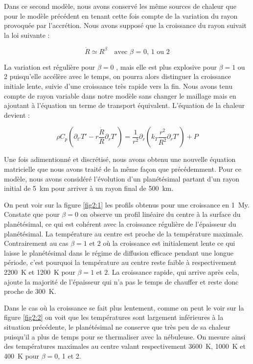 \documentclass[10pt,a4paper]{article}
\numberwithin{equation}{section}
\begin{document}
Dans ce second modèle, nous avons conservé les même sources de chaleur que pour le modèle précédent en tenant cette fois compte de la variation du rayon provoquée par l'accrétion. Nous avons supposé que la croissance du rayon suivait la loi suivante :

\begin{equation}
\dot{R} \simeq R^\beta  \quad \textrm{avec $\beta$ = 0, 1 ou 2}
\end{equation}

La variation est régulière pour $\beta = 0$ , mais elle est plus explosive pour $\beta = 1$ ou $2$ puisqu'elle accélère avec le temps, on pourra alors distinguer la croissance initiale lente, suivie d'une croissance très rapide vers la fin. 
Nous avons tenu compte de rayon variable dans notre modèle sans changer le maillage mais en ajoutant à l'équation un terme de transport équivalent. L'équation de la chaleur devient :

\begin{equation}
\rho C_p (\partial_{t'} T' - r \frac{\dot{R}}{R}\partial_{r} T')= \frac{1}{r^2} \partial_{r} ( k_{T} \frac{r^2}{R^2} \partial_{r} T')  + P
\end{equation}

Une fois adimentionné et discrétisé, nous avons obtenu une nouvelle équation matricielle que nous avons traité de la même façon que précédemment.
Pour ce modèle, nous avons considéré l'évolution d'un planétésimal partant d'un rayon initial de \SI{5}{km} pour arriver à un rayon final de \SI{500}{km}. 

On peut voir sur la figure \ref{fig2:1} les profils obtenus pour une croissance en \SI{1}{My}. Constate que pour $\beta = 0$ on observe un profil linéaire du centre à la surface du planétésimal, ce qui est cohérent avec la croissance régulière de l'épaisseur du planétésimal. La température au centre est proche de la température maximale. Contrairement au cas $\beta = 1$ et $2$ où la croissance est initialement lente ce qui laisse le planétésimal dans le régime de diffusion efficace pendant une longue période, c'est pourquoi la température au centre reste faible à respectivement \SI{2200}{K} et \SI{1200}{K} pour $\beta = 1$ et $2$. La croissance rapide, qui arrive après cela, ajoute la majorité de l'épaisseur qui n'a pas le temps de chauffer et reste donc proche de \SI{300}{K}.

Dans le cas où la croissance se fait plus lentement, comme on peut le voir sur la figure \ref{fig2:2} on voit que les températures sont largement inférieures à la situation précédente, le planétésimal ne conserve que très peu de sa chaleur puisqu'il a plus de temps pour se thermaliser avec la nébuleuse. On mesure ainsi des températures maximales au centre valant respectivement \SI{3600}{K}, \SI{1000}{K} et \SI{400}{K} pour $\beta = 0$, 1 et 2.
\end{document}
